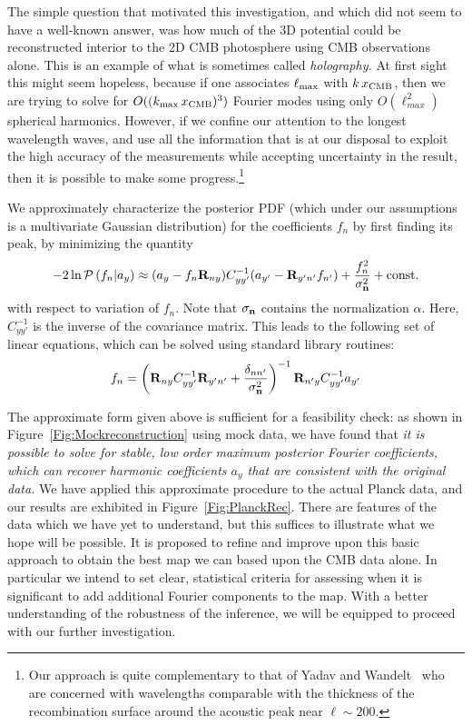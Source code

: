 \documentclass[psfig,12pt]{article}
\def\ni{\noindent}
\begin{document}
{\ni{\bf Preliminary Results:}
The simple question that motivated this investigation, and which did not
seem to have a well-known answer, was how much of the 3D potential could
be reconstructed interior to the 2D CMB photosphere using CMB
observations alone. This is an example of what is sometimes called {\it
holography.} At first sight this might seem hopeless, because if one
associates $\ell_{\rm max}$ with $k\,x_{\rm CMB}$, then we are trying to
solve for $O((k_{\rm max}\,x_{\rm CMB})^3)$ Fourier modes using only
$O(\ell_{max}^2)$ spherical harmonics. However, if we confine our
attention to the longest wavelength waves, and
use all the information that is at our disposal to exploit the high
accuracy of the measurements while accepting uncertainty in the result,
then it is possible to make some progress.\footnote{Our approach is
quite complementary to that of Yadav and Wandelt~\cite{Yadav:2005} who
are concerned with wavelengths comparable with the thickness of the
recombination surface around the acoustic peak near $\ell\sim200$.}

We approximately characterize the posterior PDF (which under our
assumptions is a multivariate Gaussian distribution) for the
coefficients $f_n$ by first finding its peak, by minimizing the quantity
\begin{equation}
-2\ln{\cal P}\left(f_n|a_y\right) \approx (a_y- f_n\mathbf{R}_{ny})C_{yy'}^{-1}(a_{y'}-\mathbf{R}_{y'n'}f_{n'})+\frac{f_n^2}{\sigma_{{\bf n}}^2} + \mathrm{const.}
\end{equation}
with respect to variation of $f_n$. Note that $\sigma_{\bf n}$ contains
the normalization $\alpha$.
Here, $C_{yy'}^{-1}$ is the inverse
of the covariance matrix. This leads to the following set of
linear equations, which can be solved using standard library routines:
\begin{equation}
f_n=\left(\mathbf{R}_{ny}C_{yy'}^{-1}\mathbf{R}_{y'n'}+\frac{\delta_{nn'}}{\sigma_{\bf n}^2}\right)^{-1}\mathbf{R}_{n'y}C_{yy'}^{-1}a_{y'}
\end{equation}

The approximate form given above is sufficient for a feasibility check:
as shown in Figure~\ref{Fig:Mockreconstruction} using mock data, we have found that {\it it is possible to solve for
stable, low order maximum posterior Fourier coefficients, which can
recover harmonic coefficients $a_y$ that are consistent with the
original data.} We have applied this approximate procedure to the
actual Planck data, and our results are exhibited in Figure~\ref{Fig:PlanckRec}. There are
features of the data which we have yet to understand, but this suffices
to illustrate what we hope will be possible. It is proposed to refine
and improve upon this basic approach to obtain the best map we can
based upon the CMB data alone. In particular we intend to set clear,
statistical criteria for assessing when it is significant to add
additional Fourier components to the map. With a better understanding of
the robustness of the inference, we will be equipped to proceed with
our further investigation.

}
\end{document}
